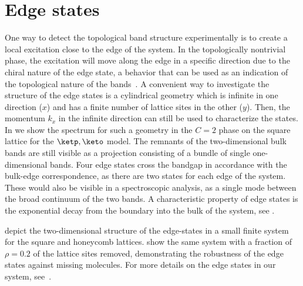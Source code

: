 \section{Edge states}
\begin{figure}
{}
\end{figure}
One way to detect the topological band structure experimentally is to create a local excitation close to the edge of the system.
In the topologically nontrivial phase, the excitation will move along the edge in a specific direction due to the chiral nature of the edge state, a behavior that can be used as an indication of the topological nature of the bands~\cite{Hafezi2013}.
A convenient way to investigate the structure of the edge states is a cylindrical geometry which is infinite in one direction ($x$) and has a finite number of lattice sites in the other ($y$).
Then, the momentum $k_x$ in the infinite direction can still be used to characterize the states.
In  we show the spectrum for such a geometry in the $C=2$ phase on the square lattice for the $\ketp, \keto$ model.
The remnants of the two-dimensional bulk bands are still visible as a projection consisting of a bundle of single one-dimensional bands.
Four edge states cross the bandgap in accordance with the bulk-edge correspondence, as there are two states for each edge of the system.
These would also be visible in a spectroscopic analysis, as a single mode between the broad continuum of the two bands.
A characteristic property of edge states is the exponential decay from the boundary into the bulk of the system, see .

 depict the two-dimensional structure of the edge-states in a small finite system for the square and honeycomb lattices.  show the same system with a fraction of $\rho=0.2$ of the lattice sites removed, demonstrating the robustness of the edge states against missing molecules.
For more details on the edge states in our system, see~\cite{Weber2015}.

